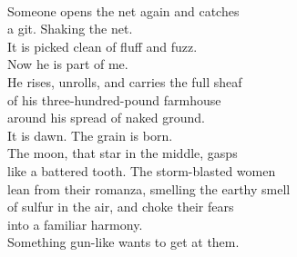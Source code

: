 \documentclass[smalldemyvopaper,11pt,twoside,onecolumn,openright,extrafontsizes]{memoir}
\begin{document}
\\Someone opens the net again and catches
\\a git. Shaking the net.
\\It is picked clean of fluff and fuzz.
\\Now he is part of me.
\\He rises, unrolls, and carries the full sheaf
\\of his three-hundred-pound farmhouse
\\around his spread of naked ground.
\\It is dawn. The grain is born.
\\The moon, that star in the middle, gasps
\\like a battered tooth. The storm-blasted women
\\lean from their romanza, smelling the earthy smell
\\of sulfur in the air, and choke their fears
\\into a familiar harmony.
\\Something gun-like wants to get at them.
\end{document}
